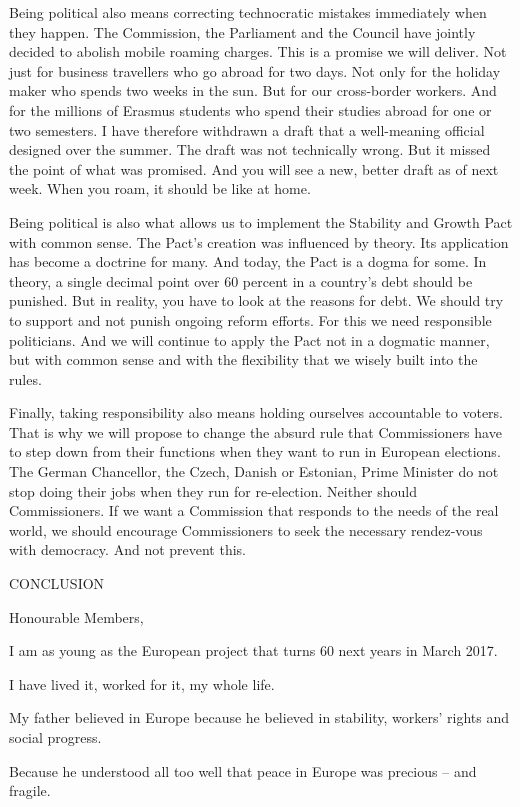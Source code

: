 \documentclass[a4paper,11pt]{article}
\begin{document}
Being political also means correcting technocratic mistakes immediately when they happen. The Commission, the Parliament and the Council have jointly decided to abolish mobile roaming charges. This is a promise we will deliver. Not just for business travellers who go abroad for two days. Not only for the holiday maker who spends two weeks in the sun. But for our cross-border workers. And for the millions of Erasmus students who spend their studies abroad for one or two semesters. I have therefore withdrawn a draft that a well-meaning official designed over the summer. The draft was not technically wrong. But it missed the point of what was promised. And you will see a new, better draft as of next week. When you roam, it should be like at home.

Being political is also what allows us to implement the Stability and Growth Pact with common sense. The Pact's creation was influenced by theory. Its application has become a doctrine for many. And today, the Pact is a dogma for some. In theory, a single decimal point over 60 percent in a country's debt should be punished. But in reality, you have to look at the reasons for debt. We should try to support and not punish ongoing reform efforts. For this we need responsible politicians. And we will continue to apply the Pact not in a dogmatic manner, but with common sense and with the flexibility that we wisely built into the rules.

Finally, taking responsibility also means holding ourselves accountable to voters. That is why we will propose to change the absurd rule that Commissioners have to step down from their functions when they want to run in European elections. The German Chancellor, the Czech, Danish or Estonian, Prime Minister do not stop doing their jobs when they run for re-election. Neither should Commissioners. If we want a Commission that responds to the needs of the real world, we should encourage Commissioners to seek the necessary rendez-vous with democracy. And not prevent this.

 

CONCLUSION

Honourable Members,

I am as young as the European project that turns 60 next years in March 2017.

I have lived it, worked for it, my whole life.

My father believed in Europe because he believed in stability, workers' rights and social progress.

Because he understood all too well that peace in Europe was precious – and fragile.
\end{document}
